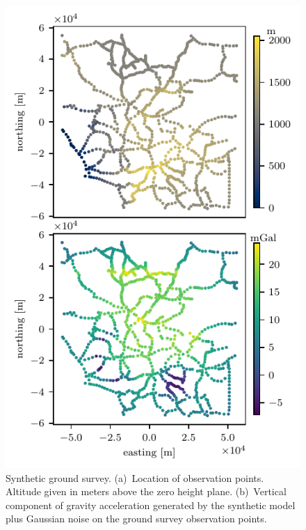\documentclass[twocolumn]{article}
\begin{document}
\begin{figure}
    \includegraphics[width=\linewidth]{figs/ground-survey.pdf}
    \caption{
        Synthetic ground survey.
        (a)~Location of observation points. Altitude given in meters above the
            zero height plane.
        (b)~Vertical component of gravity acceleration generated by the
            synthetic model plus Gaussian noise on the ground survey
            observation points.
    }
    \label{fig:synthetic-ground-survey}
\end{figure}
\end{document}
